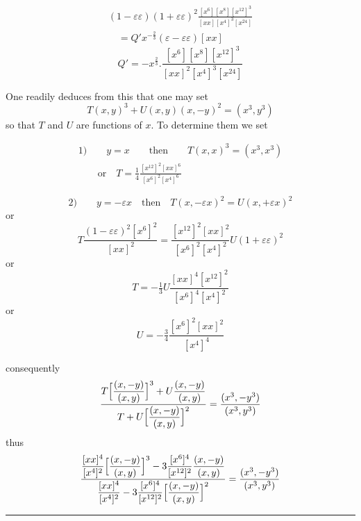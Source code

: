 \[
\begin{gathered}(1-\varepsilon\varepsilon)(1+\varepsilon\varepsilon)^2
\frac{[x^6][x^8][x^{12}]^3}{[xx][x^4]^3[x^{24}]}
\\[8pt]\quad{}=Q'x^{-\frac23}(\varepsilon-\varepsilon\varepsilon)[xx]\end{gathered}
\]
\[
Q'=-x^{\frac23}.\frac{[x^6][x^8][x^{12}]^3}{[xx]^2[x^4]^3[x^{24}]}
\]


One readily deduces from this that one may set
\[
T(x,y)^3+U(x,y)(x,-y)^2=(x^3,y^3)
\]
so that $T$ and $U$ are functions of $x$. To determine them we set



\[
\begin{gathered}1)\qquad y=x\qquad\text{then}\qquad
T(x,x)^3=(x^3,x^3)\\[8pt]\quad{}\quad\text{or}\quad
T=\tfrac14\frac{[x^{12}]^2[xx]^6}{[x^6]^2[x^4]^6}\end{gathered}
\]

\[
2)\qquad y=-\varepsilon x\quad\text{then}\quad
T(x,-\varepsilon x)^2=U(x,+\varepsilon x)^2
\]
or
\[
T\frac{(1-\varepsilon\varepsilon)^2[x^6]^2}{[xx]^2}
=\frac{[x^{12}]^2[xx]^2}{[x^6]^2[x^4]^2}U(1+\varepsilon\varepsilon)^2
\]
or
\[
T=-\tfrac13 U\frac{[xx]^4[x^{12}]^2}{[x^6]^4[x^4]^2}
\]
or
\[
U=-\tfrac34\frac{[x^6]^2[xx]^2}{[x^4]^4}
\]

consequently
\[
\begin{gathered}\frac{T\Bigl[\dfrac{(x,-y)}{(x,y)}\Bigr]^3
+U\dfrac{(x,-y)}{(x,y)}}
{T+U\Bigl[\dfrac{(x,-y)}{(x,y)}\Bigr]^2}
=\frac{(x^3,-y^3)}{(x^3,y^3)}\end{gathered}
\]
thus
\[
\begin{gathered}\frac{\dfrac{[xx]^4}{[x^4]^2}
\Bigl[\dfrac{(x,-y)}{(x,y)}\Bigr]^3
-3\dfrac{[x^6]^4}{[x^{12}]^2}\dfrac{(x,-y)}{(x,y)}}
{\dfrac{[xx]^4}{[x^4]^2}
-3\dfrac{[x^6]^4}{[x^{12}]^2}
\Bigl[\dfrac{(x,-y)}{(x,y)}\Bigr]^2}
=\frac{(x^3,-y^3)}{(x^3,y^3)}\end{gathered}
\]
\begin{center}\rule{.23\textwidth}{.3pt}\end{center}

\clearpage
\endgroup
